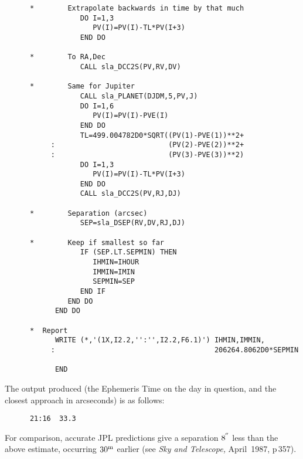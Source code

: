 \documentclass[11pt,twoside]{article}
\newcommand{\arcseci}[1] {$#1\hspace{-0.05em}$\raisebox{-0.5ex}
                         {$^{'\hspace{-0.1em}'}$}}
\renewcommand{\arcseci}[1] {$#1\hspace{-0.05em}^{'\hspace{-0.1em}'}$}
\begin{document}
\begin{verbatim}
      *        Extrapolate backwards in time by that much
                  DO I=1,3
                     PV(I)=PV(I)-TL*PV(I+3)
                  END DO

      *        To RA,Dec
                  CALL sla_DCC2S(PV,RV,DV)

      *        Same for Jupiter
                  CALL sla_PLANET(DJDM,5,PV,J)
                  DO I=1,6
                     PV(I)=PV(I)-PVE(I)
                  END DO
                  TL=499.004782D0*SQRT((PV(1)-PVE(1))**2+
           :                           (PV(2)-PVE(2))**2+
           :                           (PV(3)-PVE(3))**2)
                  DO I=1,3
                     PV(I)=PV(I)-TL*PV(I+3)
                  END DO
                  CALL sla_DCC2S(PV,RJ,DJ)

      *        Separation (arcsec)
                  SEP=sla_DSEP(RV,DV,RJ,DJ)

      *        Keep if smallest so far
                  IF (SEP.LT.SEPMIN) THEN
                     IHMIN=IHOUR
                     IMMIN=IMIN
                     SEPMIN=SEP
                  END IF
               END DO
            END DO

      *  Report
            WRITE (*,'(1X,I2.2,'':'',I2.2,F6.1)') IHMIN,IMMIN,
           :                                      206264.8062D0*SEPMIN

            END
\end{verbatim}
\goodbreak
The output produced (the Ephemeris Time on the day in question, and
the closest approach in arcseconds) is as follows:
\goodbreak
\begin{verbatim}
      21:16  33.3
\end{verbatim}
\goodbreak
For comparison, accurate JPL predictions
give a separation \arcseci{8} less than
the above estimate, occurring $30^{\rm m}$ earlier
(see {\it Sky and Telescope,}\/ April~1987, p\,357).
\end{document}
